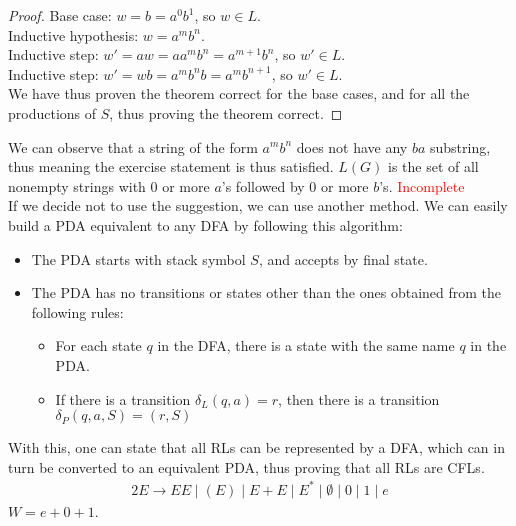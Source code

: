 \documentclass[docid=TP08]{tcom_TP}
\begin{document}
{\begin{proof}
Base case: $w=b=a^0 b^1$, so $w \in L$.\\
Inductive hypothesis: $w=a^m b^n$.\\
Inductive step: $w'=aw=a a^m b^n = a^{m+1} b^n$, so $w' \in L$.\\
Inductive step: $w'=wb=a^m b^n b= a^m b^{n+1}$, so $w' \in L$.\\
We have thus proven the theorem correct for the base cases, and for all the productions of $S$, thus proving the theorem correct.
\end{proof}
We can observe that a string of the form $a^m b^n$ does not have any $ba$ substring, thus meaning the exercise statement is thus satisfied.
$L(G)$ is the set of all nonempty strings with 0 or more $a$'s followed by 0 or more $b$'s.
\textcolor{red}{Incomplete}\\
If we decide not to use the suggestion, we can use another method. We can easily build a PDA equivalent to any DFA by following this algorithm:
\begin{itemize}
	\item The PDA starts with stack symbol $S$, and accepts by final state.
	\item The PDA has no transitions or states other than the ones obtained from the following rules:
	\begin{itemize}
		\item For each state $q$ in the DFA, there is a state with the same name $q$ in the PDA.
		\item If there is a transition $\delta_L(q,a)=r$, then there is a transition $\delta_P(q,a,S)=(r,S)$
	\end{itemize}
\end{itemize}
With this, one can state that all RLs can be represented by a DFA, which can in turn be converted to an equivalent PDA, thus proving that all RLs are CFLs.
\pagebreak
{}
\begin{alignat*}{2}
	E \rightarrow EE\mid (E)\mid E+E\mid E^*\mid \emptyset\mid 0\mid 1\mid e
\end{alignat*}
$W=e+0+1$.\\
\begin{minipage}[t]{0.49\textwidth}
\begin{center}

\end{center}
\end{minipage}}
\end{document}
